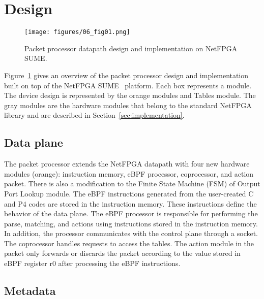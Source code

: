 \section{\system Design}
\label{sec:design}

\begin{figure}[!htbp]
\centering
\texttt{[image: figures/06\_fig01.png]}
\caption{Packet processor datapath design and implementation on NetFPGA SUME.}
\label{fig:06_fig01}
\end{figure}

Figure~\ref{fig:06_fig01} gives an overview of the packet processor design and implementation built on top of the NetFPGA SUME~\cite{SUME2014} platform. 
Each box represents a module.
The device design is represented by the orange modules and Tables module.
The gray modules are the hardware modules that belong to the standard NetFPGA library and are described in Section~\ref{sec:implementation}.


\subsection{Data plane}

The packet processor extends the NetFPGA datapath with four new hardware modules (orange): instruction memory, eBPF processor, coprocessor, and action packet. There is also a modification to the Finite State Machine (FSM) of Output Port Lookup module. The eBPF instructions generated from the user-created C and P4 codes are stored in the instruction memory. These instructions define the behavior of the data plane. The eBPF processor is responsible for performing the parse, matching, and actions using instructions stored in the instruction memory. In addition, the processor communicates with the control plane through a socket. The coprocessor handles requests to access the tables. The action module in the packet only forwards or discards the packet according to the value stored in eBPF register r0 after processing the eBPF instructions. %

\subsection{Metadata}
\label{sec:metadata}


